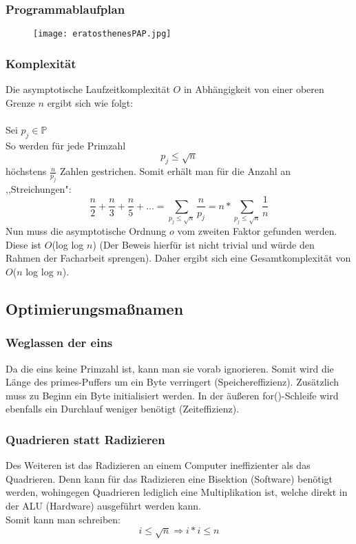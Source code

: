 \documentclass[a4paper,12pt]{article}
\begin{document}
\subsubsection{Programmablaufplan}
\begin{figure}[h]
\texttt{[image: eratosthenesPAP.jpg]}
\end{figure}

\subsubsection{Komplexität}
Die asymptotische Laufzeitkomplexität $O$ in Abhängigkeit von einer oberen Grenze $n$ ergibt sich wie folgt:\\\\
Sei $p_j \in \mathbb{P}$\\
So werden für jede Primzahl 
\[ p_j \leq \sqrt{n} \]
höchstens $\frac{n}{p_j}$ Zahlen gestrichen. Somit erhält man für die Anzahl an ,,Streichungen":\\
\[ \frac{n}{2} + \frac{n}{3} + \frac{n}{5} + ... = \sum_{p_j\leq\sqrt{n}}{\frac{n}{p_j}} = n * \sum_{p_j\leq\sqrt{n}}{\frac{1}{n}}\]
Nun muss die asymptotische Ordnung $o$ vom zweiten Faktor gefunden werden. Diese ist $O$(log log $n$) (Der Beweis hierfür ist nicht trivial und würde den Rahmen der Facharbeit sprengen). Daher ergibt sich eine Gesamtkomplexität von $O$($n$ log log $n$).


\subsection{Optimierungsmaßnamen}

\subsubsection{Weglassen der eins}
Da die eins keine Primzahl ist, kann man sie vorab ignorieren. Somit wird die Länge des primes-Puffers um ein Byte verringert (Speichereffizienz). Zusätzlich muss zu Beginn ein Byte initialisiert werden. In der äußeren for()-Schleife wird ebenfalls ein Durchlauf weniger benötigt (Zeiteffizienz).\\

\subsubsection{Quadrieren statt Radizieren}
Des Weiteren ist das Radizieren an einem Computer ineffizienter als das Quadrieren. Denn kann für das Radizieren eine Bisektion (Software) benötigt werden, wohingegen Quadrieren lediglich eine Multiplikation ist, welche direkt in der ALU (Hardware) ausgeführt werden kann.\\
Somit kann man schreiben:\\
\[ i \leq \sqrt{n} \Rightarrow i * i \leq n \]
\end{document}
